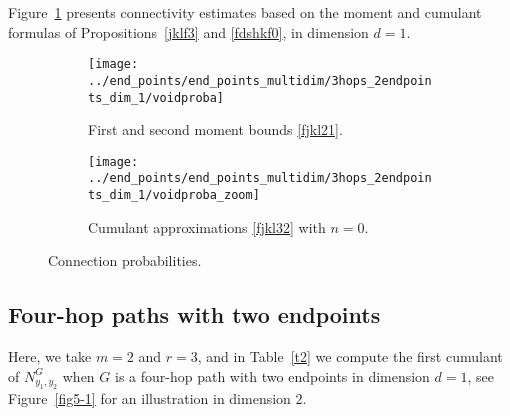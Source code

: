 \documentclass[12pt]{article}
\numberwithin{equation}{section}
\begin{document}
\begin{table}[H] 
  \centering
\scriptsize %
{}
\caption{Computation times and counts of connected non-flat {\em vs} all
 partitions in $\Pi ([n]\times[2])$.}
\label{t1-1}
\end{table} 

\vspace{-0.4cm}

\noindent
 Figure~\ref{fig2-111} presents connectivity estimates based
 on the moment 
 and cumulant formulas of Propositions~\ref{jklf3} and \ref{fdshkf0},
 in dimension $d=1$. 

\begin{figure}[H]
  \centering
 \begin{subfigure}{0.49\textwidth}
   \texttt{[image: ../end\_points/end\_points\_multidim/3hops\_2endpoints\_dim\_1/voidproba]} 
    \caption{First and second moment bounds \eqref{fjkl21}.} 
 \end{subfigure}
 \begin{subfigure}{0.49\textwidth}
   \texttt{[image: ../end\_points/end\_points\_multidim/3hops\_2endpoints\_dim\_1/voidproba\_zoom]} 
   \vskip-0.1cm
   \caption{Cumulant approximations \eqref{fjkl32} with $n=0$.} 
 \end{subfigure}
 \caption{Connection probabilities.} 
\label{fig2-111} 
\end{figure}

\noindent
\subsection{Four-hop paths with two endpoints}
\noindent 
 Here, we take $m=2$ and $r=3$, and in Table~\ref{t2} we 
 compute the first cumulant of $N^G_{y_1,y_2}$ when $G$ is
 a four-hop path with two endpoints in dimension $d=1$, 
 see Figure~\ref{fig5-1} for an illustration in dimension $2$.  
\end{document}
